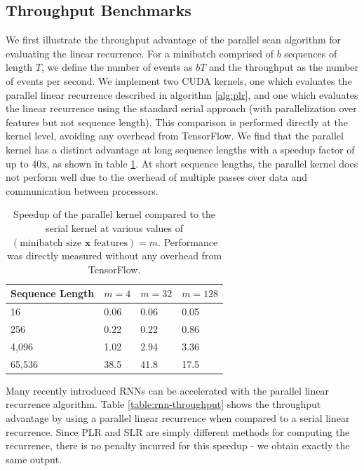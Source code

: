 \documentclass{article}
\begin{document}
\subsection{Throughput Benchmarks}
We first illustrate the throughput advantage of the parallel scan algorithm for
evaluating the linear recurrence. For a minibatch comprised of \(b\) sequences
of length \(T\), we define the number of events as \(bT\) and the throughput as
the number of events per second. We implement two CUDA kernels, one which
evaluates the parallel linear recurrence described in algorithm \ref{alg:plr},
and one which evaluates the linear recurrence using the standard serial
approach (with parallelization over features but not sequence length).
This comparison is performed directly at the kernel level, avoiding
any overhead from TensorFlow. We find that the parallel kernel has
a distinct advantage at long sequence lengths with a speedup factor of up to 40x,
as shown in table \ref{table:kernel-throughput}.
At short sequence lengths, the parallel kernel does not perform well due to the
overhead of multiple passes over data and communication between processors.
\begin{table}[]
  \centering
  \caption{
    Speedup of the parallel kernel compared to the serial kernel at various
    values of $(\text{minibatch size } \mathbf{x} \text{ features}) = m$.
    Performance was directly measured without any overhead from TensorFlow.
  }
\label{table:kernel-throughput}
\begin{tabular}{@{}llll@{}}
Sequence Length & \(m=4\)  & \(m=32\) & \(m=128\) \\ \midrule
16              & 0.06 & 0.06 & 0.05  \\
256             & 0.22 & 0.22 & 0.86  \\
4,096           & 1.02 & 2.94 & 3.36  \\
65,536          & 38.5 & 41.8 & 17.5  \\ \bottomrule
\end{tabular}
\end{table}

Many recently introduced RNNs can be accelerated with the parallel linear recurrence
algorithm.
Table \ref{table:rnn-throughput} shows the
throughput advantage by using a parallel linear recurrence when compared to a
serial linear recurrence. Since PLR and SLR are simply different methods for
computing the recurrence, there is no penalty incurred for this speedup - we
obtain exactly the same output.
\end{document}
